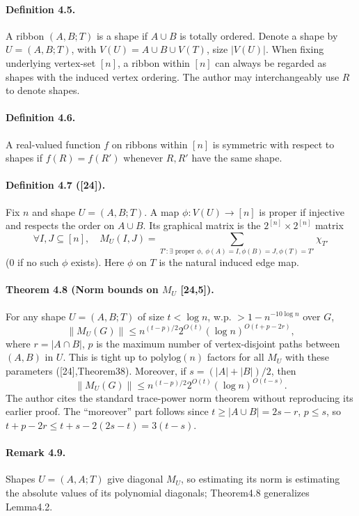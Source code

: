 \paragraph{Definition 4.5.} A ribbon $(A,B;T)$ is a shape if $A\cup B$ is totally ordered. Denote a shape by $U=(A,B;T)$, with $V(U)=A\cup B\cup V(T)$, size $|V(U)|$. When fixing underlying vertex-set $[n]$, a ribbon within $[n]$ can always be regarded as shapes with the induced vertex ordering. The author may interchangeably use $R$ to denote shapes.
\paragraph{Definition 4.6.} A real-valued function $f$ on ribbons within $[n]$ is symmetric with respect to shapes if $f(R)=f(R')$ whenever $R,R'$ have the same shape.
\paragraph{Definition 4.7 ([24]).} Fix $n$ and shape $U=(A,B;T)$. A map $\phi:V(U)\to[n]$ is proper if injective and respects the order on $A\cup B$. Its graphical matrix is the $2^{[n]}\times2^{[n]}$ matrix
\[\forall I,J\subseteq[n],\quad M_U(I,J)=\sum_{T':\exists\text{ proper }\phi,\ \phi(A)=I,\phi(B)=J,\phi(T)=T'}\chi_{T'}\]
(0 if no such $\phi$ exists). Here $\phi$ on $T$ is the natural induced edge map.
\paragraph{Theorem 4.8 (Norm bounds on $M_U$ [24,5]).} For any shape $U=(A,B;T)$ of size $t<\log n$, w.p. $>1-n^{-10\log n}$ over $G$,
\[\|M_U(G)\|\le n^{(t-p)/2}2^{O(t)}(\log n)^{O(t+p-2r)},\tag{4.6}\]
where $r=|A\cap B|$, $p$ is the maximum number of vertex-disjoint paths between $(A,B)$ in $U$. This is tight up to $\mathrm{polylog}(n)$ factors for all $M_U$ with these parameters ([24],Theorem38). Moreover, if $s=(|A|+|B|)/2$, then
\[\|M_U(G)\|\le n^{(t-p)/2}2^{O(t)}(\log n)^{O(t-s)}.\tag{4.7}\]
The author cites the standard trace-power norm theorem without reproducing its earlier proof. The ``moreover'' part follows since $t\ge|A\cup B|=2s-r$, $p\le s$, so $t+p-2r\le t+s-2(2s-t)=3(t-s)$.
\paragraph{Remark 4.9.} Shapes $U=(A,A;T)$ give diagonal $M_U$, so estimating its norm is estimating the absolute values of its polynomial diagonals; Theorem4.8 generalizes Lemma4.2.
